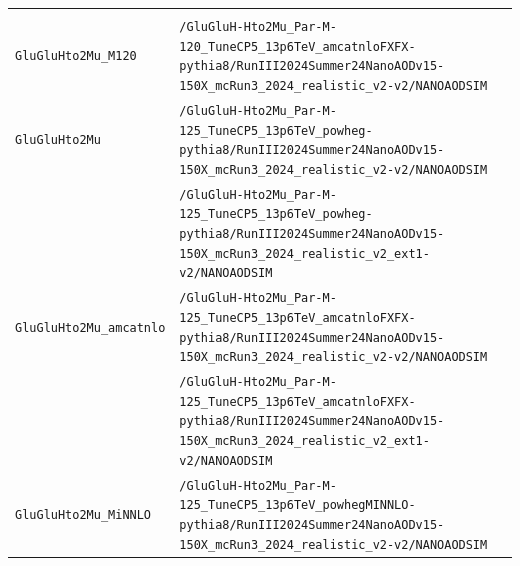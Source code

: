\begin{longtable}{@{}>{\RaggedRight\arraybackslash}p{} >{\RaggedRight\arraybackslash}p{}@{}}
\addlinespace[2pt]
\addlinespace[4pt]
\multicolumn{2}{@{}l}{\bfseries Simulation (174 samples)} \\
\addlinespace[2pt]
\texttt{GluGluHto2Mu\_\allowbreak{}M120} & \texttt{/\allowbreak{}GluGluH-\allowbreak{}Hto2Mu\_\allowbreak{}Par-\allowbreak{}M-\allowbreak{}120\_\allowbreak{}TuneCP5\_\allowbreak{}13p6TeV\_\allowbreak{}amcatnloFXFX-\allowbreak{}pythia8/\allowbreak{}RunIII2024Summer24NanoAODv15-\allowbreak{}150X\_\allowbreak{}mcRun3\_\allowbreak{}2024\_\allowbreak{}realistic\_\allowbreak{}v2-\allowbreak{}v2/\allowbreak{}NANOAODSIM} \\
\addlinespace[2pt]
\texttt{GluGluHto2Mu} & \texttt{/\allowbreak{}GluGluH-\allowbreak{}Hto2Mu\_\allowbreak{}Par-\allowbreak{}M-\allowbreak{}125\_\allowbreak{}TuneCP5\_\allowbreak{}13p6TeV\_\allowbreak{}powheg-\allowbreak{}pythia8/\allowbreak{}RunIII2024Summer24NanoAODv15-\allowbreak{}150X\_\allowbreak{}mcRun3\_\allowbreak{}2024\_\allowbreak{}realistic\_\allowbreak{}v2-\allowbreak{}v2/\allowbreak{}NANOAODSIM} \\
 & \texttt{/\allowbreak{}GluGluH-\allowbreak{}Hto2Mu\_\allowbreak{}Par-\allowbreak{}M-\allowbreak{}125\_\allowbreak{}TuneCP5\_\allowbreak{}13p6TeV\_\allowbreak{}powheg-\allowbreak{}pythia8/\allowbreak{}RunIII2024Summer24NanoAODv15-\allowbreak{}150X\_\allowbreak{}mcRun3\_\allowbreak{}2024\_\allowbreak{}realistic\_\allowbreak{}v2\_\allowbreak{}ext1-\allowbreak{}v2/\allowbreak{}NANOAODSIM} \\
\addlinespace[2pt]
\texttt{GluGluHto2Mu\_\allowbreak{}amcatnlo} & \texttt{/\allowbreak{}GluGluH-\allowbreak{}Hto2Mu\_\allowbreak{}Par-\allowbreak{}M-\allowbreak{}125\_\allowbreak{}TuneCP5\_\allowbreak{}13p6TeV\_\allowbreak{}amcatnloFXFX-\allowbreak{}pythia8/\allowbreak{}RunIII2024Summer24NanoAODv15-\allowbreak{}150X\_\allowbreak{}mcRun3\_\allowbreak{}2024\_\allowbreak{}realistic\_\allowbreak{}v2-\allowbreak{}v2/\allowbreak{}NANOAODSIM} \\
 & \texttt{/\allowbreak{}GluGluH-\allowbreak{}Hto2Mu\_\allowbreak{}Par-\allowbreak{}M-\allowbreak{}125\_\allowbreak{}TuneCP5\_\allowbreak{}13p6TeV\_\allowbreak{}amcatnloFXFX-\allowbreak{}pythia8/\allowbreak{}RunIII2024Summer24NanoAODv15-\allowbreak{}150X\_\allowbreak{}mcRun3\_\allowbreak{}2024\_\allowbreak{}realistic\_\allowbreak{}v2\_\allowbreak{}ext1-\allowbreak{}v2/\allowbreak{}NANOAODSIM} \\
\addlinespace[2pt]
\texttt{GluGluHto2Mu\_\allowbreak{}MiNNLO} & \texttt{/\allowbreak{}GluGluH-\allowbreak{}Hto2Mu\_\allowbreak{}Par-\allowbreak{}M-\allowbreak{}125\_\allowbreak{}TuneCP5\_\allowbreak{}13p6TeV\_\allowbreak{}powhegMINNLO-\allowbreak{}pythia8/\allowbreak{}RunIII2024Summer24NanoAODv15-\allowbreak{}150X\_\allowbreak{}mcRun3\_\allowbreak{}2024\_\allowbreak{}realistic\_\allowbreak{}v2-\allowbreak{}v2/\allowbreak{}NANOAODSIM} \\

\end{longtable}
